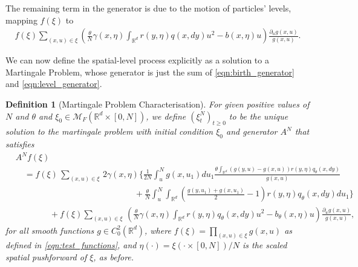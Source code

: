 \documentclass[12pt]{article}
\newtheorem{definition}[theorem]{Definition}
\newcommand{\IR}{\mathbb R}
\newcommand{\lp}{\xi}              %
\begin{document}
The remaining term in the generator is due to the motion of particles' levels,
mapping $f(\xi)$ to
\begin{align} \label{eqn:level_generator}
    f(\lp)
    \sum_{(x, u) \in \lp}
    \left(
    \frac{\theta}{N}
        \gamma(x,\eta) \int_{\IR^d} r(y, \eta) q(x, dy) u^2
        -
        b(x, \eta)u
    \right)
    \frac{\partial_u g(x,u)}{g(x,u)} .
\end{align}



We can now define the spatial-level process
explicitly as a solution to a Martingale Problem,
whose generator is just the sum of
\eqref{eqn:birth_generator} and \eqref{eqn:level_generator}.

\begin{definition}[Martingale Problem Characterisation]
    \label{defn:lookdown_mgale}
For given positive values of $N$ and $\theta$
and $\lp_0 \in \mathcal{M}_F(\mathbb{R}^d \times [0,N])$,
we define $(\lp^{N}_t)_{t \geq 0}$
to be the unique solution to the martingale problem
with initial condition $\lp_0$ and generator $A^{N}$ that satisfies
\begin{equation*}
\begin{split}
& A^{N}f(\lp ) \\
&\quad =
    f(\lp)
    \,\sum_{(x,u)\in \lp}\,
    2 \gamma(x, \eta)
    \Bigg\{ \frac{1}{2N} \int_u^N g(x,u_1) du_1
            \frac{
                \theta \int_{\mathbb{R}^d}
                (g(y,u) - g(x,u))
                r(y, \eta) q_{\theta}(x,dy)
            }{ g(x,u) }
        \\
    &\qquad\qquad\qquad\qquad\qquad\qquad\qquad {} +
        \frac{\theta}{N} \int_u^N
        \int_{\mathbb{R}^d}\left(
            \frac{ g(y,u_1) + g(x,u_1) }{ 2 } - 1
        \right)
        r(y, \eta) q_{\theta}(x,dy)
        du_1
    \Bigg\}\\
    &\qquad\qquad {} +
    f(\lp) \sum_{(x,u)\in\lp}\,
    \left(
        \frac{\theta}{N} \gamma(x,\eta) \int_{\IR^d} r(y, \eta) q_\theta(x, dy) u^2 -b_{\theta}(x,\eta)u
    \right)
    \frac{\partial_u g(x,u)}{g(x,u)}
    ,
\end{split}
\end{equation*}
for all smooth functions $g \in C^{2}_{0}(\mathbb{R}^d)$,
where $f(\lp) = \prod_{(x, u) \in \lp} g(x, u)$ as defined in \eqref{eqn:test_functions},
and $\eta(\cdot) = \lp(\cdot \times [0, N]) / N$ is the scaled spatial pushforward of $\lp$,
as before.
\end{definition}
\end{document}
